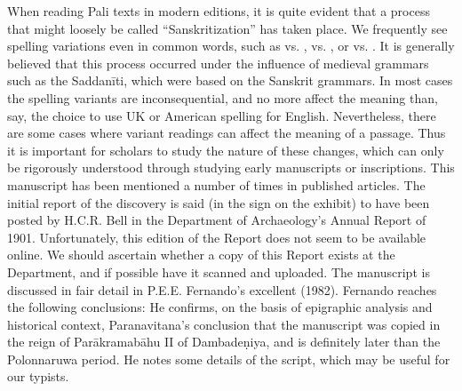 {}When reading Pali texts in modern editions, it is quite evident that a process that might loosely be called “Sanskritization” has taken place. We frequently see spelling variations even in common words, such as  vs. ,  vs. , or  vs. . It is generally believed that this process occurred under the influence of medieval grammars such as the Saddanīti, which were based on the Sanskrit grammars. In most cases the spelling variants are inconsequential, and no more affect the meaning than, say, the choice to use UK or American spelling for English. Nevertheless, there are some cases where variant readings can affect the meaning of a passage. Thus it is important for scholars to study the nature of these changes, which can only be rigorously understood through studying early manuscripts or inscriptions.\markdownRendererInterblockSeparator
{}\markdownRendererInterblockSeparator
{}This manuscript has been mentioned a number of times in published articles.\markdownRendererInterblockSeparator
{}The initial report of the discovery is said (in the sign on the exhibit) to have been posted by H.C.R. Bell in the Department of Archaeology’s Annual Report of 1901. Unfortunately, this edition of the Report does not seem to be available online. We should ascertain whether a copy of this Report exists at the Department, and if possible have it scanned and uploaded.\markdownRendererInterblockSeparator
{}The manuscript is discussed in fair detail in P.E.E. Fernando’s excellent  (1982). Fernando reaches the following conclusions:\markdownRendererInterblockSeparator
{}\markdownRendererUlBeginTight
\markdownRendererUlItem He confirms, on the basis of epigraphic analysis and historical context, Paranavitana’s conclusion that the manuscript was copied in the reign of Parākramabāhu II of Dambadeṇiya, and is definitely later than the Polonnaruwa period.\markdownRendererUlItemEnd 
\markdownRendererUlItem He notes some details of the script, which may be useful for our typists.\markdownRendererUlItemEnd 
